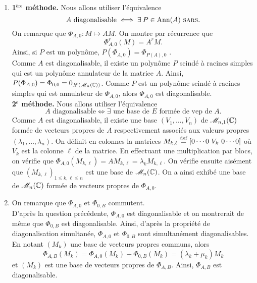 \begin{solution}
    \begin{enumerate}
        \item \textbf{1$^\text{ère}$ méthode.} Nous allons utiliser l'équivalence
        $$A \text{ diagonalisable} \iff \exists P \in \mathrm{Ann}(A) \text{ \textsc{sars}}.$$
        On remarque que $\Phi_{A, 0}: M \mapsto AM$. On montre par récurrence que 
        $$\Phi_{A, 0}^r(M) = A^r M.$$
        Ainsi, si $P$ est un polynôme, $P(\Phi_{A, 0}) = \Phi_{P(A), 0}$ \note. \\
        Comme $A$ est diagonalisable, il existe un polynôme $P$ scindé à racines simples qui est un polynôme annulateur de la matrice $A$. Ainsi, $P(\Phi_{A, 0}) = \Phi_{0, 0} = 0_{\mathscr{L} \left( \mathscr{M}_n(\mathbb{C}) \right)}$. Comme $P$ est un polynôme scindé à racines simples qui est annulateur de $\Phi_{A, 0}$, alors $\Phi_{A, 0}$ est diagonalisable. \\
        \textbf{2$^\text{e}$ méthode.} Nous allons utiliser l'équivalence 
        $$A \text{  diagonalisable} \iff \exists \text{ une base de $E$ formée de vep de $A$}.$$
        Comme $A$ est diagonalisable, il existe une base $(V_1, \dots, V_n)$ de $\mathscr{M}_{n,1}(\mathbb{C})$ formée de vecteurs propres de $A$ respectivement associés aux valeurs propres $(\lambda_1, \dots, \lambda_n)$. On définit en colonnes la matrices $M_{k, \ell} \overset{\mathrm{\tiny def}}{=} [ 0 \cdots 0\ V_k\ 0 \cdots 0]$ où $V_k$ est la colonne $\ell$ de la matrice. En effectuant une multiplication par blocs, on vérifie que $\Phi_{A, 0}(M_{k, \ell}) = A M_{k, \ell} = \lambda_k M_{k, \ell}$. On vérifie ensuite aisément que $(M_{k, \ell})_{1 \leqslant k, \ell \leqslant n}$ est une base de $\mathscr{M}_n(\mathbb{C})$. On a ainsi exhibé une base de $\mathscr{M}_n(\mathbb{C})$ formée de vecteurs propres de $\Phi_{A, 0}$. 
        \item On remarque que $\Phi_{A, 0}$ et $\Phi_{0, B}$ commutent. \\
        D'après la question précédente, $\Phi_{A, 0}$ est diagonalisable et on montrerait de même que $\Phi_{0, B}$ est diagonalisable. Ainsi, d'après la propriété de diagonalisation simultanée, $\Phi_{A, 0}$ et $\Phi_{0, B}$ sont simultanément diagonalisables. \\
        En notant $(M_k)$ une base de vecteurs propres communs, alors
        $$\Phi_{A, B} (M_k) = \Phi_{A, 0} (M_k) + \Phi_{0, B} (M_k) = (\lambda_k + \mu_k) M_k$$
        et $(M_k)$ est une base de vecteurs propres de $\Phi_{A, B}$. Ainsi, $\Phi_{A, B}$ est diagonalisable. 
    \end{enumerate}
\end{solution}
